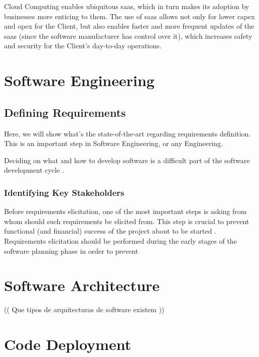 Cloud Computing enables ubiquitous \gls{saas}, which in turn makes its adoption by businesses more enticing to them. The use of \gls{saas} allows not only for lower \gls{capex} and \gls{opex} for the Client, but also enables faster and more frequent updates of the \gls{saas} (since the software manufacturer has control over it), which increases safety and security for the Client's day-to-day operations. 


\section{Software Engineering}\label{state-of-the-art:s:software-engineering}

\subsection{Defining Requirements}\label{state-of-the-art:ss:defining-requirements}

Here, we will show what's the state-of-the-art regarding requirements definition. This is an important step in Software Engineering, or any Engineering.

Deciding on what and how to develop software is a difficult part of the software development cycle \parencite{pacheco_garcía_reyes_2018}.

\subsubsection{Identifying Key Stakeholders}\label{state-of-the-art:sss:identifying-key-stakeholders}

Before requirements elicitation, one of the most important steps is asking from whom should such requirements be elicited from. This step is crucial to prevent functional (and financial) success of the project about to be started \parencite{lewellen_2020}. Requirements elicitation should be performed during the early stages of the software planning phase in order to prevent



\section{Software Architecture}\label{state-of-the-art:s:software-architecture}

(( Que tipos de arquitecturas de software existem ))

\section{Code Deployment}\label{state-of-the-art:s:code-deployment}

